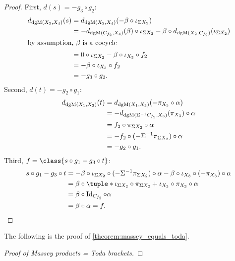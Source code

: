 \begin{proof}
    First, \( d(s) = -g_3 \circ g_2 \):
    \begin{align*}
        d_{\operatorname{dgM}(X_2, X_4)}(s) &= d_{\operatorname{dgM}(X_2, X_4)}(- \beta \circ \iota_{\Sigma X_2}) \\
        &= - d_{\operatorname{dgM}(C_{f_2}, X_4)}(\beta) \circ \iota_{\Sigma X_2} - \beta \circ d_{\operatorname{dgM}(X_2, C_{f_2})}(\iota_{\Sigma X_2}) \\
        \intertext{by assumption, \( \beta \) is a cocycle}
        &= 0 \circ \iota_{\Sigma X_2} - \beta \circ \iota_{X_3} \circ f_2 \\
        &= - \beta \circ \iota_{X_3} \circ f_2 \\
        &= - g_3 \circ g_2.
    \end{align*}
    Second, \( d(t) = - g_2 \circ g_1 \):
    \begin{align*}
         d_{\operatorname{dgM}(X_1, X_3)}(t) &= d_{\operatorname{dgM}(X_1, X_3)}(- \pi_{X_3} \circ \alpha) \\
         &= -d_{\operatorname{dgM}(\Sigma^{-1} C_{f_2}, X_3)}(\pi_{X_3}) \circ \alpha \\
         &= f_2 \circ \pi_{\Sigma X_2} \circ \alpha \\
         &= - f_2 \circ (- \Sigma^{-1} \pi_{\Sigma X_2}) \circ \alpha \\
         &= - g_2 \circ g_1.
    \end{align*}
    Third, \( f = \class{s \circ g_1 - g_3 \circ t} \):
    \begin{align*}
        s \circ g_1 - g_3 \circ t &= - \beta \circ \iota_{\Sigma X_2} \circ (-\Sigma^{-1} \pi_{\Sigma X_2}) \circ \alpha - \beta \circ \iota_{X_3} \circ (- \pi_{X_3}) \circ \alpha \\
        &= \beta \circ \tuple*{\iota_{\Sigma X_2} \circ \pi_{\Sigma X_2} + \iota_{X_3} \circ \pi_{X_3}} \circ \alpha \\
        &= \beta \circ \Id_{C_{f_2}} \circ \alpha \\
        &= \beta \circ \alpha = f.
    \end{align*}
\end{proof}

The following is the proof of \autoref{theorem:massey_equals_toda}.

\begin{proof}[Proof of Massey products = Toda brackets]
    
\end{proof}